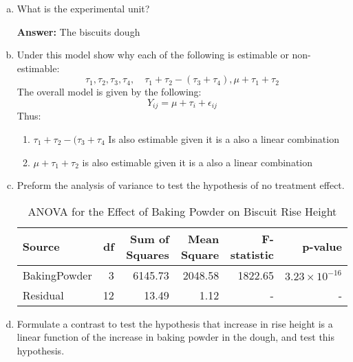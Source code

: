 \documentclass{article}
\begin{document}
\begin{enumerate}[(a)]
	\item What is the experimental unit?

	      \textbf{Answer:} The biscuits dough
	\item Under this model  show why each of the following is estimable or non-estimable:
	      $$
		      \tau_1, \tau_2, \tau_3,\tau_4, \quad \tau_1 + \tau_2 - (\tau_3 + \tau_4), \mu + \tau_1 + \tau_2
	      $$
	      The overall model is given by the following:
	      $$
		      Y_{ij} = \mu + \tau_i + \epsilon_{ij}
	      $$
	      Thus:
	      \begin{enumerate}
		      \item $\tau_1 + \tau_2 -(\tau_3 + \tau_4$ Is also estimable given it is a also a linear combination
		      \item $\mu + \tau_1 + \tau_2$ is also estimable given it is a also a linear combination
	      \end{enumerate}
	\item Preform the analysis of variance to test the hypothesis of no treatment effect.
	      \begin{table}[!ht]
		      \centering
		      \caption{ANOVA for the Effect of Baking Powder on Biscuit Rise Height}
		      \begin{tabular}{lrrrrr}
			      \hline
			      \textbf{Source} & \textbf{df} & \textbf{Sum of Squares} & \textbf{Mean Square} & \textbf{F-statistic} & \textbf{p-value}         \\
			      \hline
			      BakingPowder    & 3           & 6145.73                 & 2048.58              & 1822.65              & \(3.23 \times 10^{-16}\) \\
			      Residual        & 12          & 13.49                   & 1.12                 & -                    & -                        \\
			      \hline
		      \end{tabular}
	      \end{table}

	\item Formulate a contrast to test the hypothesis that increase in rise height is a linear function of the increase in baking powder in the dough,
	      and test this hypothesis.


\end{enumerate}
\end{document}

